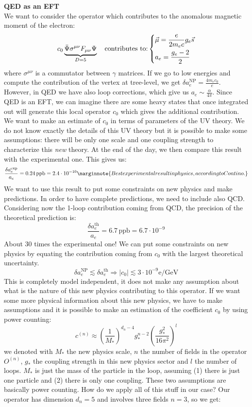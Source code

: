 \documentclass[../main.tex]{subfiles}
\begin{document}
\begin{example}\textbf{QED as an EFT}\\
We want to consider the operator which contributes to the anomalous magnetic moment of the electron:
\[
c_0\underbrace{\Bar{\Psi}\sigma^{\mu\nu}F_{\mu\nu}\Psi}_{D=5}\quad\text{contributes to:}\left\{\begin{aligned}
&\Vec{\mu}=\frac{e}{2m_ec}g_e\Vec{s}\\
&a_e=\frac{g_e-2}{2}
\end{aligned}\right.
\]
where $\sigma^{\mu\nu}$ is a commutator between $\gamma$ matrices. If we go to low energies and compute the contribution of the vertex at tree-level, we get $\delta a_e^{\text{NP}}=\frac{4m_ec_0}{e}$. However, in QED we have also loop corrections, which give us $a_e\sim\frac{\alpha}{4\pi}$. Since QED is an EFT, we can imagine there are some heavy states that once integrated out will generate this local operator $c_0$ which gives the additional contribution. We want to make an estimate of $c_0$ in terms of parameters of the UV theory. We do not know exactly the details of this UV theory but it is possible to make some assumptions: there will be only one scale and one coupling strength to characterize this \textit{new} theory. At the end of the day, we then compare this result with the experimental one. This gives us:
\[
\frac{\delta a_e^{\text{exp}}}{a_e}=0.24\,\text{ppb}=2.4\cdot10^{-10}\marginnote{Best experimental result in physics, according to Contino.}
\]
We want to use this result to put some constraints on new physics and make predictions. In order to have complete predictions, we need to include also QCD. Considering now the 1-loop contribution coming from QCD, the precision of the theoretical prediction is:
\[
\frac{\delta a_e^{\text{th}}}{a_e}=6.7\,\text{ppb}=6.7\cdot10^{-9}
\]
About 30 times the experimental one! We can put some constraints on new physics by equating the contribution coming from $c_0$ with the largest theoretical uncertainty.
\[
\delta a_e^{\text{NP}}\lesssim\delta a_e^{\text{th}}\Rightarrow|c_0|\lesssim3\cdot10^{-9} \text{e/GeV}
\]
This is completely model independent, it does not make any assumption about what is the nature of this new physics contributing to this operator. If we want some more physical information about this new physics, we have to make assumptions and it is possible to make an estimation of the coefficient $c_0$ by using power counting:
\[
c^{(n)}\approx\left(\frac{1}{M_*}\right)^{d_n-4}g_*^{n-2}\left(\frac{g_*^2}{16\pi^2}\right)^l
\]
we denoted with $M_*$ the new physics scale, $n$ the number of fields in the operator $O^{(n)}$, $g_*$ the coupling strength in this new physics sector and $l$ the number of loops. $M_*$ is just the mass of the particle in the loop, assuming (1) there is just one particle and (2) there is only one coupling. These two assumptions are basically power counting. How do we apply all of this stuff in our case? Our operator has dimension $d_n=5$ and involves three fields $n=3$, so we get:

\end{example}
\end{document}
